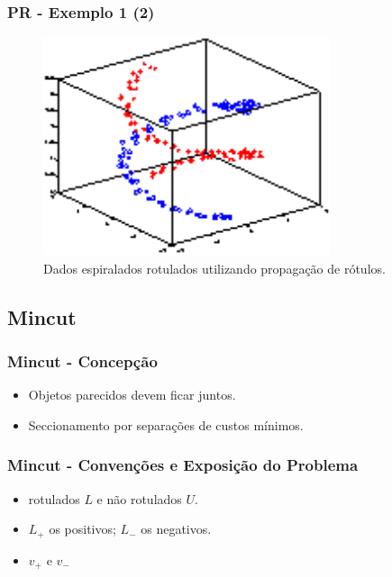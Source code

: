 \documentclass{beamer}
\begin{document}
      \frame
      {
        \frametitle{PR - Exemplo 1 (2)}
        \begin{figure}[!h]
          \begin{center}
                  \includegraphics[width=0.75\textwidth]{prop2-dados-rotu}
          \end{center}
            \caption{Dados espiralados rotulados utilizando propagação de rótulos.}
        \end{figure}
      }

    \subsection{Mincut}
      \frame
      {
        \frametitle{Mincut - Concepção}
        \begin{itemize}
          \item Objetos parecidos devem ficar juntos.
          \item Seccionamento por separações de custos mínimos.
        \end{itemize}
      }

      \frame
      {
        \frametitle{Mincut - Convenções e Exposição do Problema}
        \begin{itemize}
          \item <1-> rotulados $L$ e não rotulados $U$.
          \item <2-> $L_+$ os positivos; $L_-$ os negativos.
          \item <3-> $v_+$ e $v_-$
        \end{itemize}
      }
\end{document}
